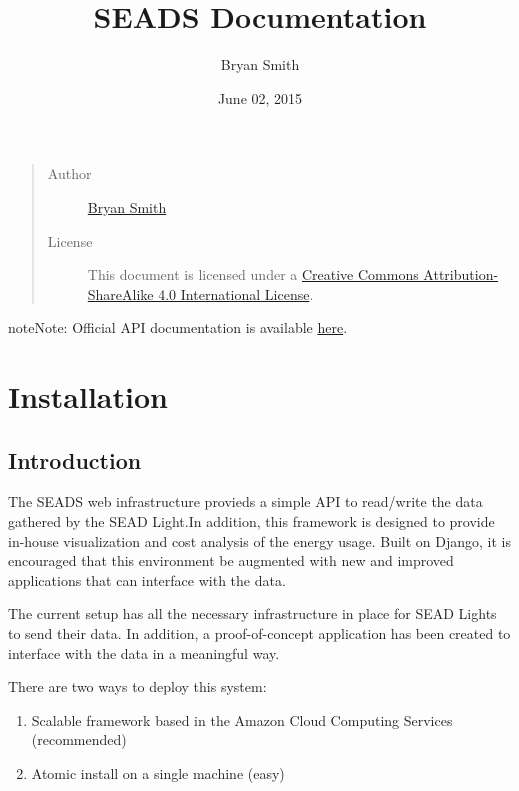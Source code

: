 \documentclass[letterpaper,10pt,english]{sphinxmanual}
\title{SEADS Documentation}
\date{June 02, 2015}
\author{Bryan Smith}
\begin{document}
\maketitle
\tableofcontents
{}\label{index::doc}

\begin{quote}\begin{description}
\item[{Author}] \leavevmode
\href{https://github.com/brabsmit}{Bryan Smith}

\item[{License}] \leavevmode
This document is licensed under a \href{http://creativecommons.org/licenses/by-sa/4.0/}{Creative Commons Attribution-ShareAlike 4.0 International License}.

\end{description}\end{quote}

\begin{notice}{note}{Note:}
Official API documentation is available \href{http://seads.io/docs/}{here}.
\end{notice}


\chapter{Installation}
\label{installation:installation}\label{installation:smart-energy-analysis-and-disaggregation-web-components}\label{installation::doc}\label{installation:id1}

\section{Introduction}
\label{installation:introduction}
The SEADS web infrastructure provieds a simple API to read/write the data gathered by the SEAD Light.In addition, this framework is designed to provide in-house visualization and cost analysis of the energy usage. Built on Django, it is encouraged that this environment be augmented with new and improved applications that can interface with the data.

The current setup has all the necessary infrastructure in place for SEAD Lights to send their data. In addition, a proof-of-concept application has been created to interface with the data in a meaningful way.

There are two ways to deploy this system:
\begin{enumerate}
\item {} 
Scalable framework based in the Amazon Cloud Computing Services (recommended)

\item {} 
Atomic install on a single machine (easy)

\end{enumerate}
\end{document}

